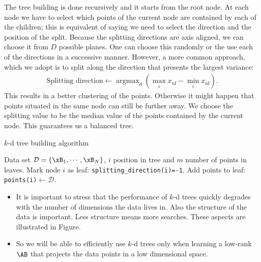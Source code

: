The tree building is done recursively and it starts from the root node. At each
node we have to select which points of the current node are contained by each of
the children; this is equivalent of saying we need to select the direction and
the position of the split. Because the splitting directions are axis aligned, we
can choose it from $D$ possible planes. One can choose this randomly or the use
each of the directions in a successive manner. However, a more common approach,
which we adopt is to split along the direction that presents the largest
variance: 
\begin{align}
	\text{Splitting direction} \leftarrow \operatorname{argmax}_{d} (\max_ix_{id} -
\min_ix_{id}).
	\label{eq:splitting-direction}
\end{align}
This results in a better clustering of the points. Otherwise it might happen
that points situated in the same node can still be further away. We choose the
splitting value to be the median value of the points contained by the current
node. This guarantees us a balanced tree.

	\begin{algorithm} 
		\caption{$k$-d tree building algorithm} 
		\label{alg:kd-tree-build}  
		\begin{algorithmic}                    %
			\REQUIRE Data set $\mathcal{D}=\{\xB_1,\cdots,\xB_N\}$, $i$ position in tree
and $m$ number of points in leaves.
				\STATE Mark node $i$ as leaf: \texttt{splitting\_direction(i)=-1}.
				\STATE Add points to leaf: \texttt{points(i)}$\leftarrow \mathcal{D}$.
				\RETURN
			\ENDIF
		\end{algorithmic}
	\end{algorithm}
	
	\begin{itemize}
		\item It is important to stress that the performance of $k$-d trees quickly
degrades with the number of dimensions the data lives in. Also the structure of
the data is important. Less structure means more searches. These aspects are
illustrated in Figure. 
		\item So we will be able to efficiently use $k$-d trees only when learning a
low-rank $\AB$ that projects the data points in a low dimensional space.
	\end{itemize}
	
